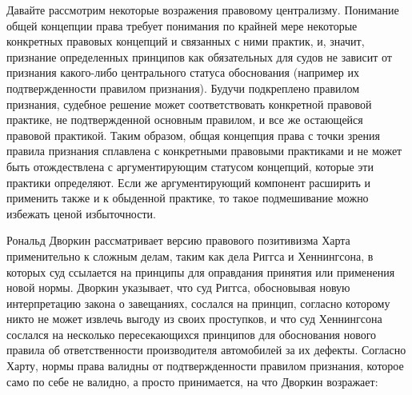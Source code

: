 \documentclass[11pt]{book}
\begin{document}
Давайте рассмотрим некоторые возражения правовому централизму. Понимание общей концепции права требует понимания по крайней мере некоторые конкретных правовых концепций и связанных с ними практик, и, значит, признание определенных принципов как обязательных для судов не зависит от признания какого-либо центрального статуса обоснования (например их подтвержденности правилом признания). Будучи подкреплено правилом признания, судебное решение может соответствовать конкретной правовой практике, не подтвержденной основным правилом, и все же остающейся правовой практикой. Таким образом, общая концепция права с точки зрения правила признания сплавлена с конкретными правовыми практиками и не может быть отождествлена с аргументирующим статусом концепций, которые эти практики определяют. Если же аргументирующий компонент расширить и применить также и к обыденной практике, то такое подмешивание можно избежать ценой избыточности.

Рональд Дворкин рассматривает версию правового позитивизма Харта применительно к сложным делам, таким как дела Риггса и Хеннингсона, в которых суд ссылается на принципы для оправдания принятия или применения новой нормы. Дворкин указывает, что суд Риггса, обосновывая новую интерпретацию закона о завещаниях, сослался на принцип, согласно которому никто не может извлечь выгоду из своих проступков, и что суд Хеннингсона сослался на несколько пересекающихся принципов для обоснования нового правила об ответственности производителя автомобилей за их дефекты. Согласно Харту, нормы права валидны от подтвержденности правилом признания, которое само по себе не валидно, а просто принимается, на что Дворкин возражает:

\smallskip
\end{document}
